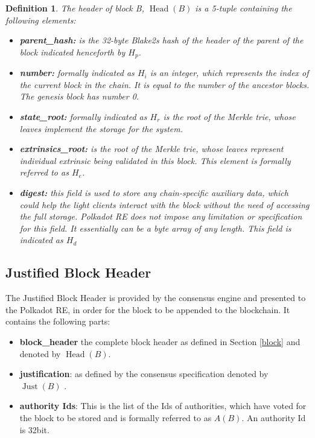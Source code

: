 \documentclass{article}
\newcommand{\tmop}[1]{\ensuremath{\operatorname{#1}}}
\newcommand{\tmsamp}[1]{\textsf{#1}}
\newcommand{\tmstrong}[1]{\textbf{#1}}
\newcommand{\tmtextbf}[1]{{\bfseries{#1}}}
\newcommand{\tmtextsf}[1]{{\sffamily{#1}}}
\newtheorem{definition}{Definition}
\providecommand{\tmop}[1]{\ensuremath{\mathrm{#1}}}
\providecommand{\tmsamp}[1]{\tmtextsf{#1}}
\providecommand{\tmstrong}[1]{\tmtextbf{#1}}
\providecommand{\tmtextbf}[1]{\tmtextbf{#1}}
\newtheorem{definition}{Definition}
\begin{document}
\begin{definition}
  \label{def-block-header}The header of block B, $\tmop{Head} (B)$ is a
  5-tuple containing the following elements:
  \begin{itemize}
    \item \tmtextbf{{\tmsamp{parent\_hash:}}} is the 32-byte Blake2s hash of
    the header of the parent of the block indicated henceforth by
    \tmtextbf{$H_p$}.
    
    \item {\tmstrong{{\tmsamp{number:}}}} formally indicated as
    {\tmstrong{$H_i$}} is an integer, which represents the index of the
    current block in the chain. It is equal to the number of the ancestor
    blocks. The genesis block has number 0.
    
    \item {\tmstrong{{\tmsamp{state\_root:}}}} formally indicated as
    {\tmstrong{$H_r$}} is the root of the Merkle trie, whose leaves implement
    the storage for the system.
    
    \item {\tmstrong{{\tmsamp{extrinsics\_root:}}}} is the root of the Merkle
    trie, whose leaves represent individual extrinsic being validated in this
    block. This element is formally referred to as {\tmstrong{$H_e$}}.
    
    \item {\tmstrong{{\tmsamp{digest:}}}} this field is used to store any
    chain-specific auxiliary data, which could help the light clients interact
    with the block without the need of accessing the full storage. Polkadot RE
    does not impose any limitation or specification for this field. It
    essentially can be a byte array of any length. This field is indicated as
    {\tmstrong{$H_d$}}
  \end{itemize}
\end{definition}

\subsection{Justified Block Header}

The Justified Block Header is provided by the consensus engine and presented
to the Polkadot RE, in order for the block to be appended to the blockchain.
It contains the following parts:
\begin{itemize}
  \item {\tmstrong{{\tmsamp{{\tmstrong{block\_header}}}}}} the complete block
  header as defined in Section \ref{block} and denoted by $\tmop{Head} (B)$.
  
  \item {\tmstrong{{\tmsamp{justification}}}}: as defined by the consensus
  specification denoted by $\tmop{Just} (B)$ {}.
  
  \item {\tmstrong{{\tmsamp{authority Ids}}}}: This is the list of the Ids of
  authorities, which have voted for the block to be stored and is formally
  referred to as $A (B)$. An authority Id is 32bit.
\end{itemize}
\end{document}

